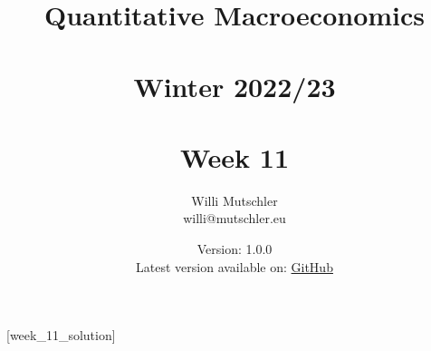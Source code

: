 
\newif\ifDisplaySolutions%


\title{Quantitative Macroeconomics\\~\\Winter 2022/23\\~\\Week 11}
\author{Willi Mutschler\\willi@mutschler.eu}
\date{Version: 1.0.0\\Latest version available on: \href{https://github.com/wmutschl/Quantitative-Macroeconomics/releases/latest/download/week_11.pdf}{GitHub}}
\maketitle\thispagestyle{empty}

\newpage
{}[week_11_solution]
\tableofcontents\thispagestyle{empty}\newpage

\setcounter{page}{1}
\newpage
\newpage
\newpage
\printbibliography
\newpage

\ifDisplaySolutions
\newpage
\appendix
\section{Solutions}

\fi
